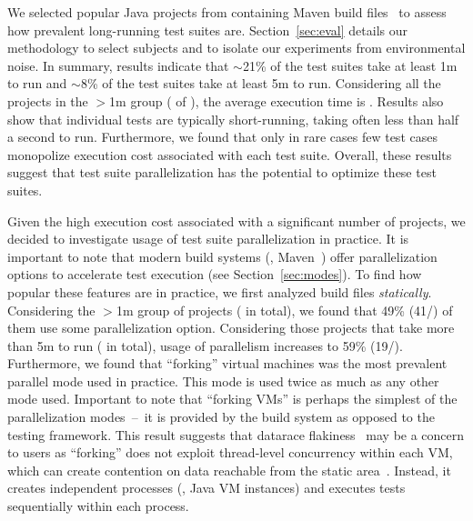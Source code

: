 

We selected \numSubjs{} popular Java projects from \github{}
containing Maven build files~\cite{maven} to assess how prevalent
long-running test suites are.  Section~\ref{sec:eval} details our
methodology to select subjects and to isolate our experiments from
environmental noise.  In summary, results indicate that $\sim$21\% of
the test suites take at least 1m to run and $\sim$8\% of the test
suites take at least 5m to run.  Considering all the \numMedLong{}
projects in the $>$1m group (\percentMedLongRunning{} of
\numSubjs{}), the
average execution time is \averageMedLongRunning{}.  Results also show
that individual tests are typically short-running, taking often less
than half a second to run.  Furthermore, we found that only in rare
cases few test cases monopolize execution cost associated with each
test suite.  Overall, these results suggest that test suite
parallelization has the potential to optimize these test suites.

Given the high execution cost associated with a significant number of
\github{} projects, we decided to investigate usage of test
suite parallelization in practice.  It is important to note that modern build
systems (\eg{}, Maven~\cite{maven}) offer parallelization options to
accelerate test execution (see Section~\ref{sec:modes}).  To find how
popular these features are in practice, we first analyzed build files
\emph{statically}.  Considering the $>$1m group of projects
(\numMedLong{} in total), we found that 49\% (41/\numMedLong{}) of
them use some parallelization option.  Considering those projects that
take more than 5m to run (\numLong{} in total), usage of parallelism
increases to 59\% (19/\numLong{}).  Furthermore, we found that
``forking'' virtual machines was the most prevalent parallel mode used
in practice.  This mode is used twice as much as any other mode used.
Important to note that ``forking VMs'' is perhaps the simplest of the
parallelization modes~--~it is provided by the build system as opposed
to the testing framework.  This result suggests that datarace
flakiness~\cite{luo-etal-fse2014} may be a concern to users as
``forking'' does not exploit thread-level concurrency within each VM,
which can create contention on data reachable from the static
area~\cite{bell-kaiser-icse2014,bell-etal-esecfse2015}.  Instead, it
creates independent processes (\ie{}, Java VM instances) and executes
tests sequentially within each process. 

